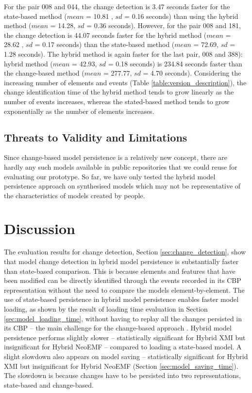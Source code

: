 \documentclass{llncs}
\begin{document}
For the pair 008 and 044, the change detection is 3.47 seconds faster for the state-based method ($mean$ = 10.81 , $sd$ = 0.16 seconds) than using the hybrid method ($mean$ = 14.28, $sd$ = 0.36 seconds). However, for the pair 008 and 181, the change detection is 44.07 seconds faster for the hybrid method ($mean$ = 28.62 , $sd$ = 0.17 seconds) than the state-based method ($mean$ = 72.69, $sd$ = 1.28 seconds). The hybrid method is again faster for the last pair, 008 and 388): hybrid method ($mean$ = 42.93, $sd$ = 0.18 seconds) is 234.84 seconds faster than the change-based method ($mean$ = 277.77, $sd$ = 4.70 seconds). Considering the increasing number of elements and events (Table \ref{table:version_description}), the change identification time of the hybrid method tends to grow linearly as the number of events increases, whereas the stated-based method tends to grow exponentially as the number of elements increases.

\subsection{Threats to Validity and Limitations}
\label{sec:threats_to_validity_and_limitations}
Since change-based model persistence is a relatively new concept, there are hardly any such models available in public repositories that we could reuse for evaluating our prototype. So far, we have only tested the hybrid model persistence approach on synthesised models which may not be representative of the characteristics of models created by people.

\section{Discussion}
\label{sec:discussion}
The evaluation results for change detection, Section \ref{sec:change_detection}, show that model change detection in hybrid model persistence is substantially faster than state-based comparison. This is because elements and features that have been modified can be directly identified through the events recorded in its CBP representation without the need to compare the models element-by-element. The use of state-based persistence in hybrid model persistence enables faster model loading, as shown by the result of loading time evaluation in Section \ref{sec:model_loading_time}, without having to replay all the changes persisted in its CBP -- the main challenge for the change-based approach \cite{yohannis2018towards,mens2002state}. 
Hybrid model persistence performs slightly slower -- statistically significant for Hybrid XMI but insignificant for Hybrid NeoEMF -- compared to loading a state-based model. A slight slowdown also appears on model saving -- statistically significant for Hybrid XMI but insignificant for Hybrid NeoEMF (Section \ref{sec:model_saving_time}). The slowdown is because changes have to be persisted into two representations, state-based and change-based. 
\end{document}
